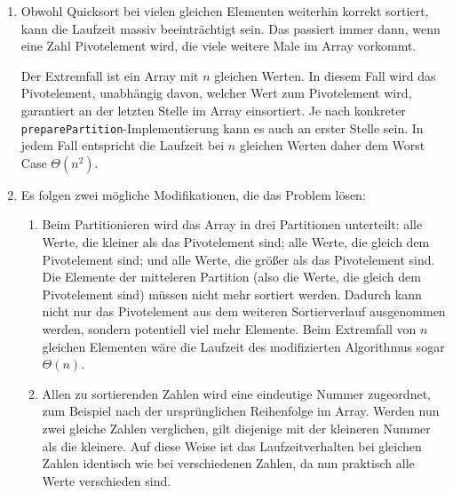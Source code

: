 \documentclass[11pt,a4paper]{article}
\begin{document}
\begin{loesung}
    \begin{enumerate}
        \item Obwohl Quicksort bei vielen gleichen Elementen weiterhin korrekt sortiert, kann die Laufzeit massiv beeinträchtigt sein.
        Das passiert immer dann, wenn eine Zahl Pivotelement wird, die viele weitere Male im Array vorkommt.
        
        Der Extremfall ist ein Array mit $n$ gleichen Werten.
        In diesem Fall wird das Pivotelement, unabhängig davon, welcher Wert zum Pivotelement wird, garantiert an der letzten Stelle im Array einsortiert.
        Je nach konkreter \texttt{preparePartition}-Implementierung kann es auch an erster Stelle sein.
        In jedem Fall entspricht die Laufzeit bei $n$ gleichen Werten daher dem Worst Case $\Theta(n^2)$.

        \item Es folgen zwei mögliche Modifikationen, die das Problem lösen:
        \begin{enumerate}[label=\roman*)]
            \item Beim Partitionieren wird das Array in drei Partitionen unterteilt: alle Werte, die kleiner als das Pivotelement sind; alle Werte, die gleich dem Pivotelement sind; und alle Werte, die größer als das Pivotelement sind.
            Die Elemente der mitteleren Partition (also die Werte, die gleich dem Pivotelement sind) müssen nicht mehr sortiert werden.
            Dadurch kann nicht nur das Pivotelement aus dem weiteren Sortierverlauf ausgenommen werden, sondern potentiell viel mehr Elemente.
            Beim Extremfall von $n$ gleichen Elementen wäre die Laufzeit des modifizierten Algorithmus sogar $\Theta(n)$.

            \item Allen zu sortierenden Zahlen wird eine eindeutige Nummer zugeordnet, zum Beispiel nach der ursprünglichen Reihenfolge im Array.
            Werden nun zwei gleiche Zahlen verglichen, gilt diejenige mit der kleineren Nummer als die kleinere.
            Auf diese Weise ist das Laufzeitverhalten bei gleichen Zahlen identisch wie bei verschiedenen Zahlen, da nun praktisch alle Werte verschieden sind.

        \end{enumerate}


\end{enumerate}
\end{loesung}
\end{document}
